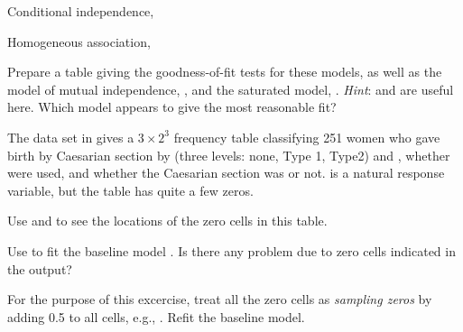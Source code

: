 \documentclass[10pt]{report}\usepackage[]{graphicx}\usepackage[]{color}
\begin{document}
\begin{Exercises}
\begin{enumerate*}
    \item Conditional independence, 
    \begin{ans}
    \end{ans}
    
    \item Homogeneous association, 
    \begin{ans}
    \end{ans}
    
    \item Prepare a table giving the goodness-of-fit tests for these models, as well as the
    model of mutual independence, , and the saturated model, .
    \emph{Hint}:  and  are useful here.
    Which model appears to give the most reasonable fit?
    \begin{ans}
    \end{ans}
    
  \end{enumerate*}

  \exercise\label{lab:caesar-loglin} The data set  in  gives a $3 \times 2^3$ 
  frequency table
  classifying 251 women who gave birth by Caesarian section by  (three levels: none, Type 1, Type2)
  and , whether  were used,  and whether the Caesarian section was 
  or not.  is a natural response variable, but the table has quite a few zeros.
  \begin{enumerate*}
    \item Use  and  to see the locations of the zero cells in this table.
    \begin{ans}
    \end{ans}
    
    \item Use  to fit the baseline model . Is there any problem due to 
    zero cells indicated in the output?
    \begin{ans}
    \end{ans}
    
    \item For the purpose of this excercise, treat all the zero cells as \emph{sampling zeros}
    by adding 0.5 to all cells, e.g., .
    Refit the baseline model.
    \begin{ans}
    \end{ans}
    

\end{enumerate*}
\end{Exercises}
\end{document}
